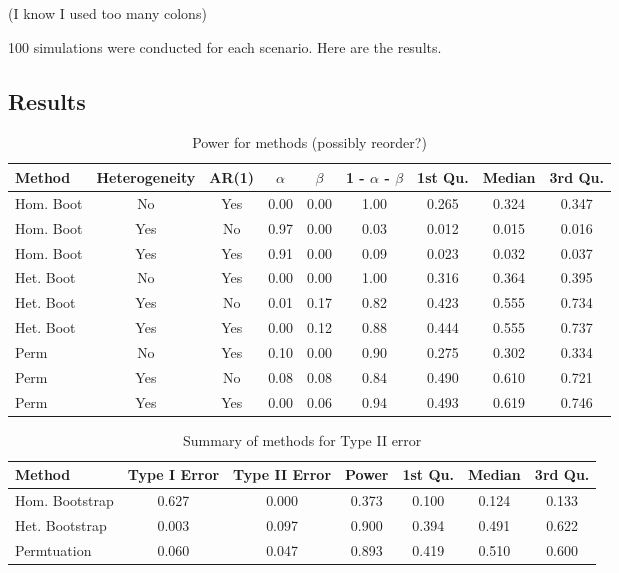 \documentclass{article}
\begin{document}
(I know I used too many colons)

100 simulations were conducted for each scenario. Here are the results.


\subsection{Results}

\begin{table}[H]
\centering
\begin{tabular}{lcccccccc}
  \hline
Method & Heterogeneity & AR(1) & $\alpha$ & $\beta$ & 1 - $\alpha$ - $\beta$ & 1st Qu. & Median & 3rd Qu. \\ 
  \hline
Hom. Boot & No & Yes & 0.00 & 0.00 & 1.00 & 0.265 & 0.324 & 0.347 \\ 
  Hom. Boot & Yes & No & 0.97 & 0.00 & 0.03 & 0.012 & 0.015 & 0.016 \\ 
  Hom. Boot & Yes & Yes & 0.91 & 0.00 & 0.09 & 0.023 & 0.032 & 0.037 \\ 
  Het. Boot & No & Yes & 0.00 & 0.00 & 1.00 & 0.316 & 0.364 & 0.395 \\ 
  Het. Boot & Yes & No & 0.01 & 0.17 & 0.82 & 0.423 & 0.555 & 0.734 \\ 
  Het. Boot & Yes & Yes & 0.00 & 0.12 & 0.88 & 0.444 & 0.555 & 0.737 \\ 
  Perm & No & Yes & 0.10 & 0.00 & 0.90 & 0.275 & 0.302 & 0.334 \\ 
  Perm & Yes & No & 0.08 & 0.08 & 0.84 & 0.490 & 0.610 & 0.721 \\ 
  Perm & Yes & Yes & 0.00 & 0.06 & 0.94 & 0.493 & 0.619 & 0.746 \\  
   \hline
\end{tabular}
\caption{Power for methods (possibly reorder?)} 
\label{tab:power_methods}
\end{table}


\begin{table}[ht]
\centering
\begin{tabular}{lcccccc}
  \hline
Method & Type I Error & Type II Error & Power & 1st Qu. & Median & 3rd Qu. \\ 
  \hline
Hom. Bootstrap & 0.627 & 0.000 & 0.373 & 0.100 & 0.124 & 0.133 \\ 
  Het. Bootstrap & 0.003 & 0.097 & 0.900 & 0.394 & 0.491 & 0.622 \\ 
  Permtuation & 0.060 & 0.047 & 0.893 & 0.419 & 0.510 & 0.600 \\ 
   \hline
\end{tabular}
\caption{Summary of methods for Type II error} 
\label{tab:type_2_summary}
\end{table}
\end{document}
